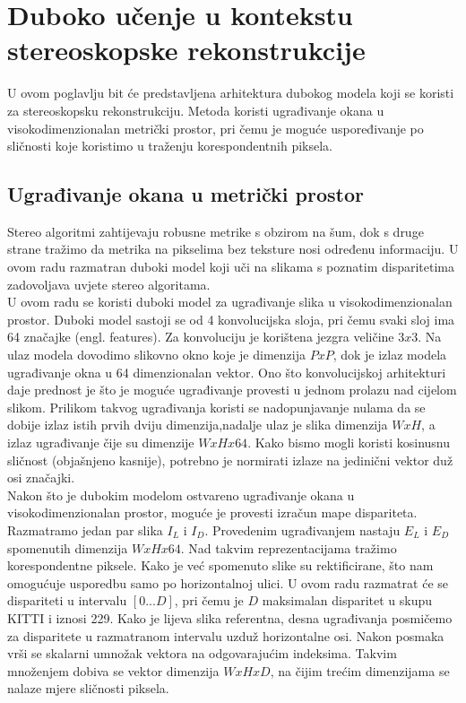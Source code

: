 \documentclass[times, utf8, zavrsni, numeric]{fer}
\begin{document}
\chapter{Duboko učenje u kontekstu stereoskopske rekonstrukcije}
U ovom poglavlju bit će predstavljena arhitektura dubokog modela koji se koristi za stereoskopsku rekonstrukciju. Metoda koristi ugrađivanje okana u visokodimenzionalan metrički prostor, pri čemu je moguće uspoređivanje po sličnosti koje koristimo u traženju korespondentnih piksela.
\section{Ugrađivanje okana u metrički prostor}
Stereo algoritmi zahtijevaju robusne metrike s obzirom na šum, dok s druge strane tražimo da metrika na pikselima bez teksture nosi određenu informaciju. U ovom radu razmatran duboki model koji uči na slikama s poznatim disparitetima zadovoljava uvjete stereo algoritama.\\
U ovom radu se koristi duboki model za ugrađivanje slika u visokodimenzionalan prostor.\citep{zbontar2} Duboki model sastoji se od 4 konvolucijska sloja, pri čemu svaki sloj ima 64 značajke (engl. features). Za konvoluciju je korištena jezgra veličine $3 x 3$. Na ulaz modela dovodimo slikovno okno koje je dimenzija $P x P$, dok je izlaz modela ugrađivanje okna u 64 dimenzionalan vektor. Ono što konvolucijskoj arhitekturi daje prednost je što je moguće ugrađivanje provesti u jednom prolazu nad cijelom slikom. Prilikom takvog ugrađivanja koristi se nadopunjavanje nulama da se dobije izlaz istih prvih dviju dimenzija,nadalje ulaz je slika dimenzija $W x H$, a izlaz ugrađivanje čije su dimenzije $W x H x 64$. Kako bismo mogli koristi kosinusnu sličnost (objašnjeno kasnije), potrebno je normirati izlaze na jedinični vektor duž osi značajki.\pagebreak
\\
Nakon što je dubokim modelom ostvareno ugrađivanje okana u visokodimenzionalan prostor, moguće je provesti izračun mape dispariteta. Razmatramo jedan par slika $I_{L}$ i $I_{D}$. Provedenim ugrađivanjem nastaju $E_{L}$ i $E_{D}$ spomenutih dimenzija $W x H x 64$. Nad takvim reprezentacijama tražimo korespondentne piksele. Kako je već spomenuto slike su rektificirane, što nam omogućuje usporedbu samo po horizontalnoj ulici. U ovom radu razmatrat će se dispariteti u intervalu $[0...D]$, pri čemu je $D$ maksimalan disparitet u skupu KITTI i iznosi 229. Kako je lijeva slika referentna, desna ugrađivanja posmičemo za disparitete u razmatranom intervalu uzduž horizontalne osi. Nakon posmaka vrši se skalarni umnožak vektora na odgovarajućim indeksima. Takvim množenjem dobiva se vektor dimenzija $W x H x D$, na čijim trećim dimenzijama se nalaze mjere sličnosti piksela.\\
\end{document}
